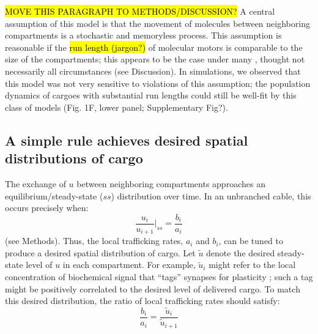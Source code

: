 \documentclass[10pt]{wlpeerj}
\begin{document}
\hl{MOVE THIS PARAGRAPH TO METHODS/DISCUSSION?} A central assumption of this model is that the movement of molecules between neighboring compartments is a stochastic and memoryless process. This assumption is reasonable if the \hl{run length (jargon?)} of molecular motors is comparable to the size of the compartments; this appears to be the case under many \citep{Muller_2008,Verbrugge_2009}, thought not necessarily all \citep{Dynes_2007} circumstances (see Discussion). In simulations, we observed that this model was not very sensitive to violations of this assumption; the population dynamics of cargoes with substantial run lengths could still be well-fit by this class of models (Fig. 1F, lower panel; Supplementary Fig?).

\subsection*{A simple rule achieves desired spatial distributions of cargo}

The exchange of $u$ between neighboring compartments approaches an equilibrium/steady-state ($ss$) distribution over time. In an unbranched cable, this occurs precisely when:
\begin{equation}
\frac{u_i}{u_{i+1}} \Bigg|_{ss} = \frac{b_i}{a_i}
\end{equation}
(see Methods). Thus, the local trafficking rates, $a_i$ and $b_i$, can be tuned to produce a desired spatial distribution of cargo. Let $\tilde{u}$ denote the desired steady-state level of $u$ in each compartment. For example, $\tilde{u}_i$ might refer to the local concentration of biochemical signal that ``tags'' synapses for plasticity \citep{Frey_1997}; such a tag might be positively correlated to the desired level of delivered cargo. To match this desired distribution, the ratio of local trafficking rates should satisfy:
\begin{equation}
\frac{b_i}{a_i} = \frac{\tilde{u}_i}{\tilde{u}_{i+1}}
\end{equation}
\end{document}
